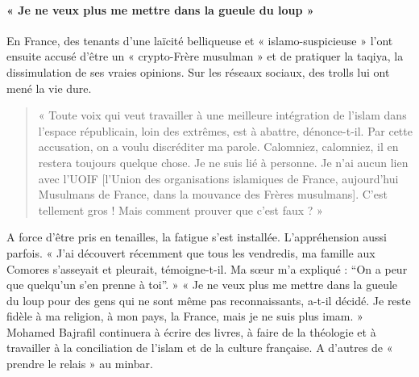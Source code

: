 \paragraph{« Je ne veux plus me mettre dans la gueule du loup »}
En France, des tenants d’une laïcité belliqueuse et « islamo-suspicieuse » l’ont ensuite accusé d’être un « crypto-Frère musulman » et de pratiquer la taqiya, la dissimulation de ses vraies opinions. Sur les réseaux sociaux, des trolls lui ont mené la vie dure. 
\begin{quote}
    « Toute voix qui veut travailler à une meilleure intégration de l’islam dans l’espace républicain, loin des extrêmes, est à abattre, dénonce-t-il. Par cette accusation, on a voulu discréditer ma parole. Calomniez, calomniez, il en restera toujours quelque chose. Je ne suis lié à personne. Je n’ai aucun lien avec l’UOIF [l’Union des organisations islamiques de France, aujourd’hui Musulmans de France, dans la mouvance des Frères musulmans]. C’est tellement gros ! Mais comment prouver que c’est faux ? »
\end{quote}

A force d’être pris en tenailles, la fatigue s’est installée. L’appréhension aussi parfois. « J’ai découvert récemment que tous les vendredis, ma famille aux Comores s’asseyait et pleurait, témoigne-t-il. Ma sœur m’a expliqué : “On a peur que quelqu’un s’en prenne à toi”. » « Je ne veux plus me mettre dans la gueule du loup pour des gens qui ne sont même pas reconnaissants, a-t-il décidé. Je reste fidèle à ma religion, à mon pays, la France, mais je ne suis plus imam. » Mohamed Bajrafil continuera à écrire des livres, à faire de la théologie et à travailler à la conciliation de l’islam et de la culture française. A d’autres de « prendre le relais » au minbar.

